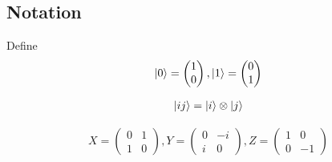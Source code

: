 \subsection{Notation}
Define 
\begin{align}
    \ket{0} = \begin{pmatrix}
        1 \\
        0
    \end{pmatrix}, \ket{1} = \begin{pmatrix}
        0 \\ 
        1
    \end{pmatrix}
\end{align}

\begin{align}
    \ket{ij} = \ket{i} \otimes \ket{j}
\end{align}

\begin{align}
    X = \begin{pmatrix}
        0 & 1 \\
        1 & 0
    \end{pmatrix}, Y = \begin{pmatrix}
        0 & -i \\
        i & 0
    \end{pmatrix}, Z = \begin{pmatrix}
        1 & 0 \\
        0 & -1
    \end{pmatrix}
\end{align}

